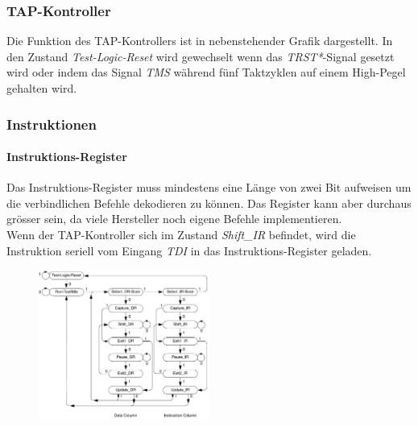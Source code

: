 \begin{multicols}{2}
    \subsubsection{TAP-Kontroller}
    Die Funktion des TAP-Kontrollers ist in nebenstehender Grafik dargestellt. In den Zustand \textit{Test-Logic-Reset} wird gewechselt wenn das \textit{TRST*}-Signal gesetzt wird oder indem das Signal \textit{TMS} während fünf Taktzyklen auf einem High-Pegel gehalten wird.
    
    \subsubsection{Instruktionen}
    \paragraph{Instruktions-Register}
    Das Instruktions-Register muss mindestens eine Länge von zwei Bit aufweisen um die verbindlichen Befehle dekodieren zu können. Das Register kann aber durchaus grösser sein, da viele Hersteller noch eigene Befehle implementieren. \\
    Wenn der TAP-Kontroller sich im Zustand \textit{Shift\_IR} befindet, wird die Instruktion seriell vom Eingang \textit{TDI} in das Instruktions-Register geladen.

    \begin{figure}[H]
        \includegraphics[width=0.5\textwidth]{images/bst_tapkontroller.png}
    \end{figure}
\end{multicols}

